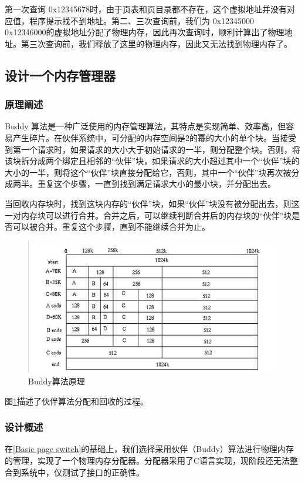 \documentclass[UTF8,12pt]{ctexart}
\begin{document}
    第一次查询 0x12345678时，由于页表和页目录都不存在，这个虚拟地址并没有对应值，程序提示找不到地址。第二、三次查询前，我们为 0x12345000 ~ 0x12346000的虚拟地址分配了物理内存，因此再次查询时，顺利计算出了物理地址。第三次查询前，我们释放了这里的物理内存，因此又无法找到物理内存了。
    
    \subsection{设计一个内存管理器}
    \subsubsection{原理阐述}
    
    Buddy 算法是一种广泛使用的内存管理算法，其特点是实现简单、效率高，但容易产生碎片。在伙伴系统中，可分配的内存空间是2的幂的大小的单个块。当接受到第一个请求时，如果请求的大小大于初始请求的一半，则分配整个块。否则，将该块拆分成两个绑定且相邻的“伙伴”块，如果请求的大小超过其中一个“伙伴”块的大小的一半，则将这个“伙伴”块直接分配给它，否则，其中一个“伙伴”块再次被分成两半。重复这个步骤，一直到找到满足请求大小的最小块，并分配出去。
    
    当回收内存块时，找到这块内存的“伙伴”块，如果“伙伴”块没有被分配出去，则这一对内存块可以进行合并。合并之后，可以继续判断合并后的内存块的“伙伴”块是否可以被合并。重复这个步骤，直到不能继续合并为止。

    \begin{figure}[H]
        \centering
        \includegraphics[width=12cm]{images/buddy.jpg}
        \caption{Buddy算法原理}
        \label{fig:buddy}
    \end{figure}
    
    图\ref{fig:buddy}描述了伙伴算法分配和回收的过程。
    
    \subsubsection{设计概述\label{设计概述}} 
    在\ref{Basic page switch}的基础上，我们选择采用伙伴（Buddy）算法进行物理内存的管理，实现了一个物理内存分配器。分配器采用了C语言实现，现阶段还无法整合到系统中，仅测试了接口的正确性。
    
\end{document}
